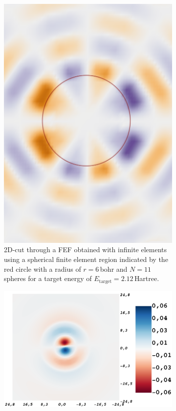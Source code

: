 \begin{figure}%
\begin{subfigure}{0.53\textwidth}
   \includegraphics[width=\textwidth]{Figures/BC/plane_fin}
   \caption{2D-cut through a FEF obtained with infinite elements using a spherical finite element region indicated by the red circle with a radius of $r=6\,$bohr and $N=11$ spheres for a target energy of $E_\text{target}=2.12\,$Hartree.}
   \label{fig:cutInfa}
\end{subfigure}
\begin{subfigure}{0.47\textwidth}
   \includegraphics[width=\textwidth]{Figures/RBF/p_wave}

\end{subfigure}
\end{figure}
